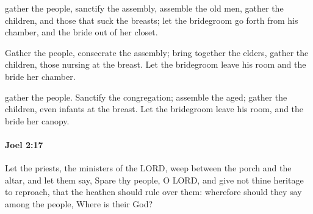			\begin{versebox}
					\item[BHS] 
					\item[LXX] 
					\item[ASV] gather the people, sanctify the assembly, assemble the old men, gather the children, and those that suck the breasts; let the bridegroom go forth from his chamber, and the bride out of her closet.
					\item[NIV] Gather the people, consecrate the assembly; bring together the elders, gather the children, those nursing at the breast. Let the bridegroom leave his room and the bride her chamber.
					\item[NRSV] gather the people. Sanctify the congregation; assemble the aged; gather the children, even infants at the breast. Let the bridegroom leave his room, and the bride her canopy.
			\end{versebox}

		\paragraph{Joel 2:17} %
			\label{JOEL-2-17}

			Let the priests, the ministers of the LORD, weep between the porch and the altar, and let them say, Spare thy people, O LORD, and give not thine heritage to reproach, that the heathen should rule over them: wherefore should they say among the people, Where is their God?

